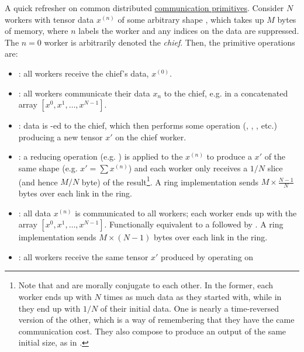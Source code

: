 \documentclass[11pt]{article}
\begin{document}
A quick refresher on common distributed
\href{https://docs.nvidia.com/deeplearning/nccl/user-guide/docs/usage/collectives.html}{communication
    primitives}.  Consider $ N $ workers with tensor data $ x ^{ (n) }  $ of some arbitrary shape
    , which takes up $ M $ bytes of memory, where $ n $ labels the worker and any
    indices on the data are suppressed. The $ n=0 $ worker is arbitrarily denoted the
    \textit{chief}.  Then, the primitive operations are:
\begin{itemize}
	\item {}: all workers receive  the chief's data, $ x ^{ (0) }  $.
	\item {}: all workers communicate their data $ x _{ n } $ to the chief, e.g. in a
	      concatenated array $ [x ^{ 0 }, x ^{ 1 }, \ldots , x ^{ N-1 }] $.
	\item {}: data is -ed to the chief, which then performs some
	      operation (, , , etc.) producing a new tensor $
		      x' $ on the chief worker.
    \item {}: a reducing operation (e.g. ) is applied to the $ x
        ^{ (n) } $ to produce a $ x' $ of the same shape (e.g. $ x'= \sum x ^{ (n) } $) and each
        worker only receives a $ 1/N $ slice (and hence $ M/N $ byte) of the result\footnote{Note that 
            and  are morally conjugate to each other. In the former, each
            worker ends up with $ N $ times as much data as they started with, while in
         they end up with $ 1/N $ of their initial data. One is nearly a
        time-reversed version of the other, which is a way of remembering that they have the came
        communication cost. They also compose to produce an output of the same initial size, as in
        .}. A ring implementation sends $ M \times \frac{ N-1 }{ N } $ bytes
        over each link in the ring.
    \item {}: all data $ x ^{ (n) } $ is communicated to all workers; each worker
        ends up with the array $ [x ^{ 0 }, x ^{ 1 }, \ldots , x ^{ N-1 }] $. Functionally
        equivalent to a  followed by . A ring implementation
        sends $ M \times \left ( N-1 \right ) $ bytes over each link in the ring.
	\item {}: all workers receive the same tensor $ x' $ produced by operating on

\end{itemize}
\end{document}
